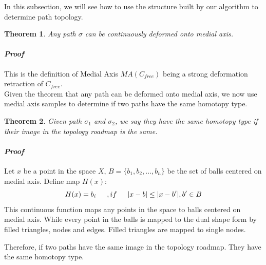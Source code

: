 \documentclass[11pt]{article}
\newtheorem{theorem}{Theorem}[section]
\begin{document}
  In this subsection, we will see how to use the structure built by our algorithm to determine path topology.  
      
  \begin{theorem}
  Any path $\sigma$ can be continuously deformed onto medial axis. 
  \end{theorem}   
  \paragraph{\emph{Proof}}
  \indent This is the definition of Medial Axis $MA(C_{free})$ being a strong deformation retraction of $C_{free}$.\\
  
  Given the theorem that any path can be deformed onto medial axis, we now use medial axis samples to determine if two paths have the same homotopy type.
  
  \begin{theorem}
  Given path $\sigma_1$ and $\sigma_2$, we say they have the same homotopy type if their image in the topology roadmap is the same. 
  \end{theorem}
  \paragraph{\emph{Proof}}
  \indent Let $x$ be a point in the space $X$, $B = \{ b_1, b_2, ..., b_n \}$ be the set of balls centered on medial axis. Define map $H(x)$:
  \begin{equation}
  H(x) = b_i \indent, if \indent |x-b| \leq |x-b'|, b' \in B
  \end{equation}
  \indent This continuous function maps any points in the space to balls centered on medial axis. While every point in the balls is mapped to the dual shape form by filled triangles, nodes and edges. Filled triangles are mapped to single nodes.   
  
  \indent Therefore, if two paths have the same image in the topology roadmap. They have the same homotopy type.

\end{document}
